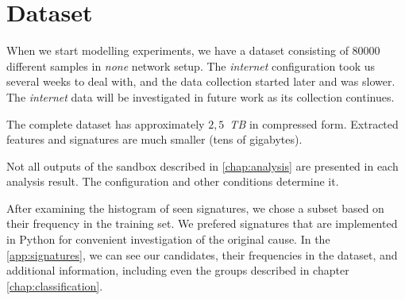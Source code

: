 \section{Dataset}
When we start modelling experiments, we have a dataset consisting of $80000$ different samples in \emph{none} network setup. The \emph{internet} configuration took us several weeks to deal with, and the data collection started later and was slower. The \emph{internet} data will be investigated in future work as its collection continues. 

The complete dataset has approximately $2,5$~\emph{TB} in compressed form. Extracted features and signatures are much smaller (tens of gigabytes). 

Not all outputs of the sandbox described in \ref{chap:analysis} are presented in each analysis result. The configuration and other conditions determine it.

After examining the histogram of seen signatures, we chose a subset based on their frequency in the training set. We prefered signatures that are implemented in Python for convenient investigation of the original cause. In the \ref{app:signatures}, we can see our candidates, their frequencies in the dataset, and additional information, including even the groups described in chapter \ref{chap:classification}.






